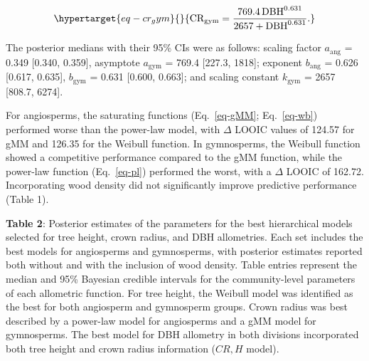 \documentclass[
  12pt,
  letterpaper,
  DIV=11,
  numbers=noendperiod]{scrartcl}
\begin{document}
\begin{equation}\protect\hypertarget{eq-cr_gym}{}{
\mathrm{CR_{gym}} = \frac{\mathrm{769.4}
\, \mathrm{DBH}^{\mathrm{0.631}}}
{\mathrm{2657}
+ \mathrm{DBH}^{\mathrm{0.631}}}.
}\label{eq-cr_gym}\end{equation}

The posterior medians with their 95\% CIs were as follows: scaling
factor \(a_{\text{ang}}\) = 0.349 {[}0.340, 0.359{]}, asymptote
\(a_{\text{gym}}\) = 769.4 {[}227.3, 1818{]}; exponent
\(b_{\text{ang}}\) = 0.626 {[}0.617, 0.635{]}, \(b_{\text{gym}}\) =
0.631 {[}0.600, 0.663{]}; and scaling constant \(k_{\text{gym}}\) = 2657
{[}808.7, 6274{]}.

For angiosperms, the saturating functions (Eq.~\ref{eq-gMM};
Eq.~\ref{eq-wb}) performed worse than the power-law model, with
\(\Delta\) LOOIC values of 124.57 for gMM and 126.35 for the Weibull
function. In gymnosperms, the Weibull function showed a competitive
performance compared to the gMM function, while the power-law function
(Eq.~\ref{eq-pl}) performed the worst, with a \(\Delta\) LOOIC of
162.72. Incorporating wood density did not significantly improve
predictive performance (Table 1).

\textbf{Table 2}: Posterior estimates of the parameters for the best
hierarchical models selected for tree height, crown radius, and DBH
allometries. Each set includes the best models for angiosperms and
gymnosperms, with posterior estimates reported both without and with the
inclusion of wood density. Table entries represent the median and 95\%
Bayesian credible intervals for the community-level parameters of each
allometric function. For tree height, the Weibull model was identified
as the best for both angiosperm and gymnosperm groups. Crown radius was
best described by a power-law model for angiosperms and a gMM model for
gymnosperms. The best model for DBH allometry in both divisions
incorporated both tree height and crown radius information (\(CR,H\)
model).

\newpage

\begingroup\fontsize{10}{12}\selectfont
\end{document}
